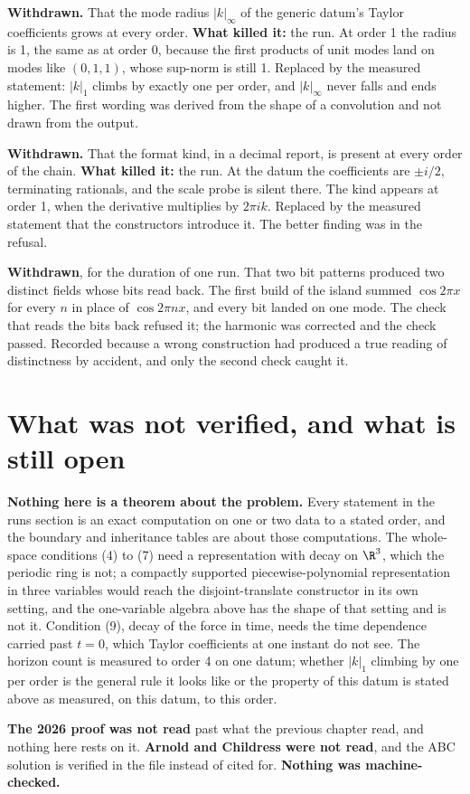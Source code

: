 \textbf{Withdrawn.} That the mode radius $|k|_\infty$ of the generic datum's Taylor coefficients grows
at every order. \textbf{What killed it:} the run. At order 1 the radius is 1, the same as at order 0,
because the first products of unit modes land on modes like $(0,1,1)$, whose sup-norm is still 1.
Replaced by the measured statement: $|k|_1$ climbs by exactly one per order, and $|k|_\infty$ never
falls and ends higher. The first wording was derived from the shape of a convolution and not drawn
from the output.

\textbf{Withdrawn.} That the format kind, in a decimal report, is present at every order of the
chain. \textbf{What killed it:} the run. At the datum the coefficients are $\pm i/2$, terminating
rationals, and the scale probe is silent there. The kind appears at order 1, when the derivative
multiplies by $2\pi i k$. Replaced by the measured statement that the constructors introduce it. The
better finding was in the refusal.

\textbf{Withdrawn}, for the duration of one run. That two bit patterns produced two distinct fields
whose bits read back. The first build of the island summed $\cos 2\pi x$ for every $n$ in place of
$\cos 2\pi n x$, and every bit landed on one mode. The check that reads the bits back refused it; the
harmonic was corrected and the check passed. Recorded because a wrong construction had produced a
true reading of distinctness by accident, and only the second check caught it.

\section{What was not verified, and what is still open}

\textbf{Nothing here is a theorem about the problem.} Every statement in the runs section is an
exact computation on one or two data to a stated order, and the boundary and inheritance tables are
about those computations. The whole-space conditions (4) to (7) need a representation with decay on
$\R^3$, which the periodic ring is not; a compactly supported piecewise-polynomial representation in
three variables would reach the disjoint-translate constructor in its own setting, and the
one-variable algebra above has the shape of that setting and is not it. Condition (9), decay of the
force in time, needs the time dependence carried past $t = 0$, which Taylor coefficients at one
instant do not see. The horizon count is measured to order 4 on one datum; whether $|k|_1$ climbing by
one per order is the general rule it looks like or the property of this datum is stated above as
measured, on this datum, to this order.

\textbf{The 2026 proof was not read} past what the previous chapter read, and nothing here rests on
it. \textbf{Arnold and Childress were not read}, and the ABC solution is verified in the file instead
of cited for. \textbf{Nothing was machine-checked.}
